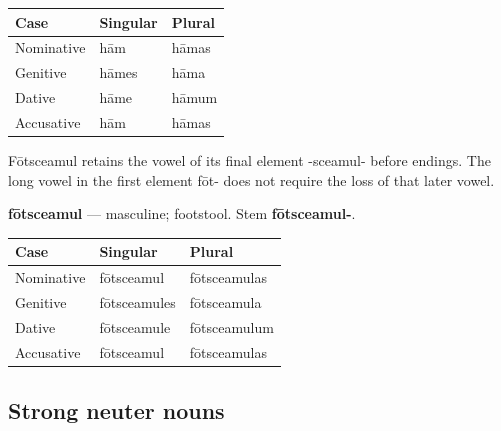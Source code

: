 \par\begingroup
\fontsize{10.5}{13.2}\selectfont
\setlength{\LTleft}{0pt}\setlength{\LTright}{\fill}
\noindent
\begin{tabular}{@{}>{\raggedright\arraybackslash}p{39.46mm}>{\raggedright\arraybackslash}p{39.46mm}>{\raggedright\arraybackslash}p{39.46mm}@{}}
\toprule
\textbf{Case} & \textbf{Singular} & \textbf{Plural} \\
\midrule
Nominative & hām & hāmas \\
Genitive & hāmes & hāma \\
Dative & hāme & hāmum \\
Accusative & hām & hāmas \\
\bottomrule
\end{tabular}
\par\endgroup

Fōtsceamul retains the vowel of its final element -sceamul- before endings. The long vowel in the first element fōt- does not require the loss of that later vowel.

\textbf{fōtsceamul} — masculine; footstool. Stem \textbf{fōtsceamul-}.

\par\begingroup
\fontsize{10.5}{13.2}\selectfont
\setlength{\LTleft}{0pt}\setlength{\LTright}{\fill}
\noindent
\begin{tabular}{@{}>{\raggedright\arraybackslash}p{34.82mm}>{\raggedright\arraybackslash}p{41.78mm}>{\raggedright\arraybackslash}p{41.78mm}@{}}
\toprule
\textbf{Case} & \textbf{Singular} & \textbf{Plural} \\
\midrule
Nominative & fōtsceamul & fōtsceamulas \\
Genitive & fōtsceamules & fōtsceamula \\
Dative & fōtsceamule & fōtsceamulum \\
Accusative & fōtsceamul & fōtsceamulas \\
\bottomrule
\end{tabular}
\par\endgroup

\subsection*{Strong neuter nouns}

